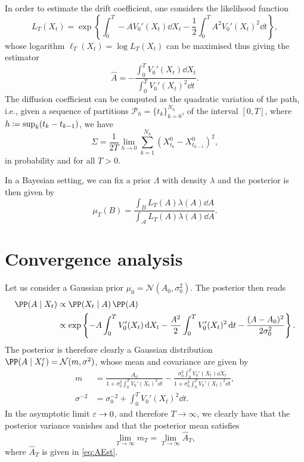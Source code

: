 \documentclass[10pt]{article}
\begin{document}
In order to estimate the drift coefficient, one considers the likelihood function
\begin{equation}
	L_T(X_t) = \exp\left\{\int_0^T -A V_0'(X_t) \dd X_t - \frac12 \int_0^T A^2 V_0'(X_t)^2 \dd t \right\},
\end{equation}
whose logarithm $\ell_T(X_t) = \log L_T(X_t)$ can be maximised thus giving the estimator
\begin{equation}\label{eq:AEst}
	\widehat A = - \frac{\int_0^T V_0'(X_t) \dd X_t}{\int_0^T V_0'(X_t)^2 \dd t}.
\end{equation}
The diffusion coefficient can be computed as the quadratic variation of the path, i.e., given a sequence of partitions $\mathcal P_h = \{t_{k}\}_{k=0}^{N_h}$, of the interval $[0, T]$, where $h \coloneqq \sup_k (t_k - t_{k-1})$, we have
\begin{equation}\label{eq:SigmaEst}
	\Sigma = \frac1{2T} \lim_{h\to 0} \sum_{k=1}^{N_h} (X^0_{t_k} - X^0_{t_{k-1}})^2,
\end{equation}
in probability and for all $T > 0$.

In a Bayesian setting, we can fix a prior $\Lambda$ with density $\lambda$ and the posterior is then given by
\begin{equation}
	\mu_T(B) = \frac{\int_B L_T(A) \lambda(A) \dd A}{\int_{\mathcal A} L_T(A) \lambda(A) \dd A}.
\end{equation}

\section{Convergence analysis}

Let us consider a Gaussian prior $\mu_0 = \mathcal N(A_0, \sigma_0^2)$. The posterior then reads
\begin{equation}
\begin{aligned}
	\PP(A \mid X_t) &\propto \PP(X_t \mid A) \, \PP(A)\\	
	&\propto \exp\left\{-A \int_0^T  V_0'(X_t) \dd X_t - \frac{A^2}{2} \int_0^T V_0'(X_t)^2 \dd t -\frac{(A - A_0)^2}{2\sigma_0^2}\right\}.
\end{aligned}
\end{equation}
The posterior is therefore clearly a Gaussian distribution $\PP(A \mid X_t^\epl) = \mathcal N(m, \sigma^2)$, whose mean and covariance are given by
\begin{equation}
\begin{aligned}
	m &= \frac{A_0}{1+\sigma_0^2\int_0^T V_0'(X_t)^2 \dd t} - \frac{\sigma_0^2\int_0^T  V_0'(X_t) \dd X_t}{1+\sigma_0^2\int_0^T V_0'(X_t)^2 \dd t}, \\
	\sigma^{-2} &= \sigma_0^{-2} + \int_0^T V_0'(X_t)^2 \dd t.
\end{aligned}
\end{equation}
In the asymptotic limit $\varepsilon \to 0$, and therefore $T \to \infty$, we clearly have that the posterior variance vanishes and that the posterior mean satisfies
\begin{equation}
	\lim_{T \to \infty} m_T = \lim_{T \to \infty} \widehat A_T,
\end{equation}
where $\widehat A_T$ is given in \eqref{eq:AEst}.
\end{document}
